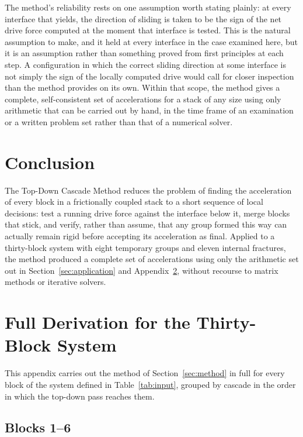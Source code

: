 \documentclass[11pt,a4paper]{article}
\begin{document}
The method's reliability rests on one assumption worth stating plainly: at every interface that yields, the direction of sliding is taken to be the sign of the net drive force computed at the moment that interface is tested. This is the natural assumption to make, and it held at every interface in the case examined here, but it is an assumption rather than something proved from first principles at each step. A configuration in which the correct sliding direction at some interface is not simply the sign of the locally computed drive would call for closer inspection than the method provides on its own. Within that scope, the method gives a complete, self-consistent set of accelerations for a stack of any size using only arithmetic that can be carried out by hand, in the time frame of an examination or a written problem set rather than that of a numerical solver.

\section{Conclusion}

The Top-Down Cascade Method reduces the problem of finding the acceleration of every block in a frictionally coupled stack to a short sequence of local decisions: test a running drive force against the interface below it, merge blocks that stick, and verify, rather than assume, that any group formed this way can actually remain rigid before accepting its acceleration as final. Applied to a thirty-block system with eight temporary groups and eleven internal fractures, the method produced a complete set of accelerations using only the arithmetic set out in Section~\ref{sec:application} and Appendix~\ref{app:derivation}, without recourse to matrix methods or iterative solvers.

\appendix
\section{Full Derivation for the Thirty-Block System}
\label{app:derivation}

This appendix carries out the method of Section~\ref{sec:method} in full for every block of the system defined in Table~\ref{tab:input}, grouped by cascade in the order in which the top-down pass reaches them.

\subsection{Blocks 1--6}
\end{document}
